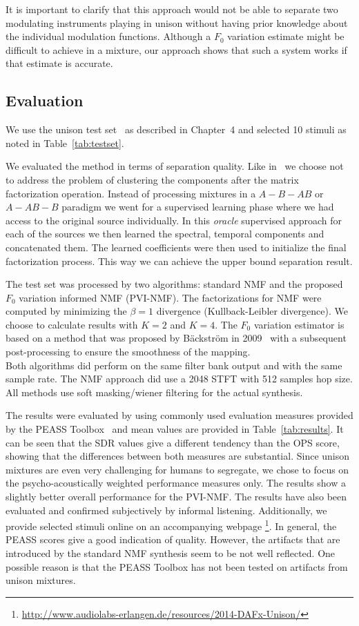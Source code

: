 It is important to clarify that this approach would not be able to separate two modulating instruments playing in unison without having prior knowledge about the individual modulation functions. Although a $F_0$ variation estimate might be difficult to achieve in a mixture, our approach shows that such a system works if that estimate is accurate.

\subsection{Evaluation}
We use the unison test set~\cite{oss_unison} as described in Chapter~4 and selected 10 stimuli as noted in Table~\ref{tab:testset}.

We evaluated the method in terms of separation quality.
Like in~\cite{barker13} we choose not to address the problem of clustering the components after the matrix factorization operation.
Instead of processing mixtures in a $A-B-AB$ or $A-AB-B$ paradigm we went for a supervised learning phase where we had access to the original source individually.
In this \emph{oracle} supervised approach for each of the sources we then learned the spectral, temporal components and concatenated them. The learned coefficients were then used to initialize the final factorization process. This way we can achieve the upper bound separation result.

The test set was processed by two algorithms: standard NMF and the proposed $F_0$ variation informed NMF (PVI-NMF). The factorizations for NMF were computed by minimizing the $\beta = 1$ divergence (Kullback-Leibler divergence).
We choose to calculate results with $K=2$ and $K=4$.
The $F_0$ variation estimator is based on a method that was proposed by B\"ackstr\"om in 2009~\cite{backstrom09} with a subsequent post-processing to ensure the smoothness of the mapping.\\

Both algorithms did perform on the same filter bank output and with the same sample rate. The NMF approach did use a 2048 STFT with 512 samples hop size.
All methods use soft masking/wiener filtering for the actual synthesis.

The results were evaluated by using commonly used evaluation measures provided by the {PEASS} Toolbox~\cite{emiya11} and mean values are provided in Table~\ref{tab:results}. It can be seen that the SDR values give a different tendency than the OPS score, showing that the differences between both measures are substantial. Since unison mixtures are even very challenging for humans to segregate, we chose to focus on the psycho-acoustically weighted performance measures only. The results show a slightly better overall performance for the PVI-NMF.
The results have also been evaluated and confirmed subjectively by informal listening. Additionally, we provide selected stimuli online on an accompanying webpage \footnote{\url{http://www.audiolabs-erlangen.de/resources/2014-DAFx-Unison/}}. In general, the PEASS scores give a good indication of quality. However, the artifacts that are introduced by the standard NMF synthesis seem to be not well reflected. One possible reason is that the PEASS Toolbox has not been tested on artifacts from unison mixtures. \\

